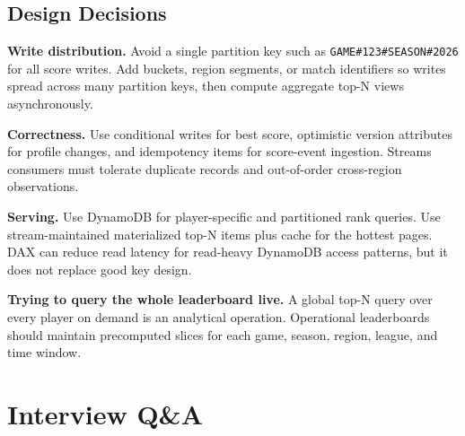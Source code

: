 \subsection{Design Decisions}
\textbf{Write distribution.} Avoid a single partition key such as \texttt{GAME\#123\#SEASON\#2026} for all score writes. Add buckets, region segments, or match identifiers so writes spread across many partition keys, then compute aggregate top-N views asynchronously.

\textbf{Correctness.} Use conditional writes for best score, optimistic version attributes for profile changes, and idempotency items for score-event ingestion. Streams consumers must tolerate duplicate records and out-of-order cross-region observations.

\textbf{Serving.} Use DynamoDB for player-specific and partitioned rank queries. Use stream-maintained materialized top-N items plus cache for the hottest pages. DAX can reduce read latency for read-heavy DynamoDB access patterns, but it does not replace good key design.

\begin{pitfall}
\textbf{Trying to query the whole leaderboard live.} A global top-N query over every player on demand is an analytical operation. Operational leaderboards should maintain precomputed slices for each game, season, region, league, and time window.
\end{pitfall}

\section{Interview Q\&A}
